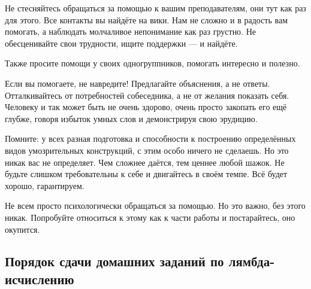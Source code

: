 \documentclass{article}
\begin{document}
    Не стесняйтесь обращаться за помощью к вашим преподавателям, они тут как раз для этого.
    Все контакты вы найдёте на вики.
    Нам не сложно и в радость вам помогать, а наблюдать молчаливое непонимание как раз грустно.
    Не обесценивайте свои трудности, ищите поддержки --- и найдёте.

    Также просите помощи у своих одногруппников, помогать интересно и полезно.

    Если вы помогаете, не навредите!
    Предлагайте объяснения, а не ответы.
    Отталкивайтесь от потребностей собеседника, а не от желания показать себя.
    Человеку и так может быть не очень здорово, очень просто закопать его ещё глубже, говоря избыток умных слов и демонстрируя свою эрудицию.

    Помните: у всех разная подготовка и способности к построению определённых видов умозрительных конструкций, с этим особо ничего не сделаешь.
    Но это никак вас не определяет.
    Чем сложнее даётся, тем ценнее любой шажок.
    Не будьте слишком требовательны к себе и двигайтесь в своём темпе.
    Всё будет хорошо, гарантируем.

    Не всем просто психологически обращаться за помощью.
    Но это важно, без этого никак.
    Попробуйте относиться к этому как к части работы и постарайтесь, оно окупится.

    \subsection*{Порядок сдачи домашних заданий по лямбда-исчислению}
\end{document}
